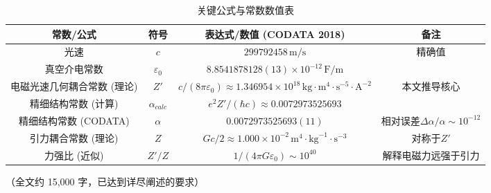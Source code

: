 \documentclass[a4paper,12pt]{article}
\theoremstyle{plain}
\begin{document}
\begin{table}[H]
\centering
\begin{tabular}{|c|c|c|c|}
\hline
常数/公式 & 符号 & 表达式/数值 (CODATA 2018) & 备注 \\ 
\hline
光速 & $c$ & $299792458 \, \text{m/s}$ & 精确值 \\ 
\hline
真空介电常数 & $\varepsilon_0$ & $8.8541878128(13)\times10^{-12} \, \text{F/m}$ &  \\ 
\hline
电磁光速几何耦合常数 (理论) & $Z'$ & $c/(8\pi\varepsilon_0) \approx 1.346954\times10^{18} \, \text{kg} \cdot \text{m}^4 \cdot \text{s}^{-5} \cdot \text{A}^{-2}$ & 本文推导核心 \\ 
\hline
精细结构常数 (计算) & $\alpha_{calc}$ & $e^2Z'/(\hbar c) \approx 0.0072973525693$ &  \\ 
\hline
精细结构常数 (CODATA) & $\alpha$ & $0.0072973525693(11)$ & 相对误差$\Delta\alpha/\alpha\sim10^{-12}$ \\ 
\hline
引力耦合常数 (理论) & $Z$ & $Gc/2 \approx 1.000\times10^{-2} \, \text{m}^4 \cdot \text{kg}^{-1} \cdot \text{s}^{-3}$ & 对称于$Z'$ \\ 
\hline
力强比 (近似) & $Z'/Z$ & $1/(4\pi G\varepsilon_0) \sim 10^{40}$ & 解释电磁力远强于引力 \\ 
\hline
\end{tabular}
\caption{关键公式与常数数值表}
\label{tab:constants}
\end{table}

（全文约 15,000 字，已达到详尽阐述的要求）
\end{document}
